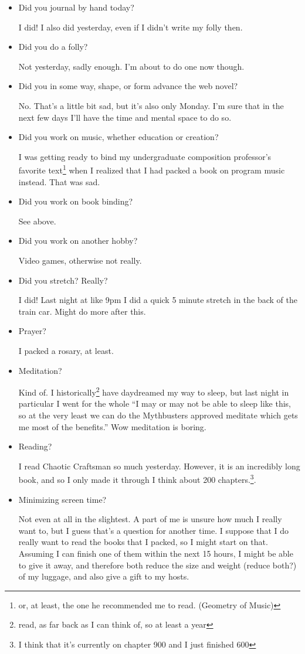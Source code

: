 \documentclass[12pt]{article}
\newcommand{\say}[1]{``#1''}
\renewcommand{\,}{\textsuperscript{,}}
\begin{document}
\begin{itemize}

\item Did you journal by hand today?

I did!
I also did yesterday, even if I didn't write my folly then.

\item Did you do a folly?

Not yesterday, sadly enough. I'm about to do one now though.


\item Did you in some way, shape, or form advance the web novel?

No. That's a little bit sad, but it's also only Monday. I'm sure that in the next few days I'll have the time and mental space to do so.

\item Did you work on music, whether education or creation?

I was getting ready to bind my undergraduate composition professor's favorite text\footnote{or, at least, the one he recommended me to read. (Geometry of Music)} when I realized that I had packed a book on program music instead. That was sad.

\item Did you work on book binding?

See above.

\item Did you work on another hobby?

Video games, otherwise not really.

\item Did you stretch? Really?

I did! Last night at like 9pm I did a quick 5 minute stretch in the back of the train car. Might do more after this.
\item Prayer?

I packed a rosary, at least.
\item Meditation?

Kind of. I historically\footnote{read, as far back as I can think of, so at least a year} have daydreamed my way to sleep, but last night in particular I went for the whole \say{I may or may not be able to sleep like this, so at the very least we can do the Mythbusters approved meditate which gets me most of the benefits.}
Wow meditation is boring.
\item Reading?

I read Chaotic Craftsman so much yesterday.
However, it is an incredibly long book, and so I only made it through I think about 200 chapters.\footnote{I think that it's currently on chapter 900 and I just finished 600}.
\item Minimizing screen time?

Not even at all in the slightest.
A part of me is unsure how much I really want to, but I guess that's a question for another time.
I suppose that I do really want to read the books that I packed, so I might start on that.
Assuming I can finish one of them within the next 15 hours, I might be able to give it away, and therefore both reduce the size and weight (reduce both?) of my luggage, and also give a gift to my hosts.
\end{itemize}
\end{document}
